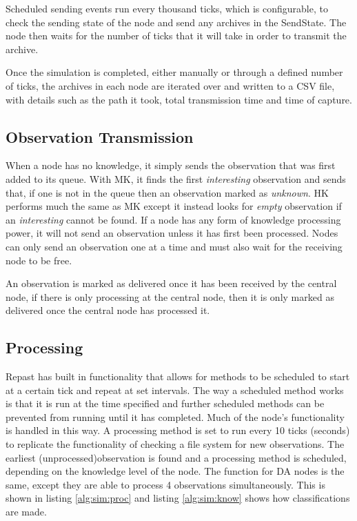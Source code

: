 	Scheduled sending events run every thousand ticks, which is configurable, to check the sending state of the node and send any archives in the SendState. The node then waits for the number of ticks that it will take in order to transmit the archive.
	
	Once the simulation is completed, either manually or through a defined number of ticks, the archives in each node are iterated over and written to a CSV file, with details such as the path it took, total transmission time and time of capture.


\subsection{Observation Transmission}
When a node has no knowledge, it simply sends the observation that was first added to its queue. With MK, it finds the first \textit{interesting} observation and sends that, if one is not in the queue then an observation marked as \textit{unknown}. HK performs much the same as MK except it instead looks for \textit{empty} observation if an \textit{interesting} cannot be found. If a node has any form of knowledge processing power, it will not send an observation unless it has first been processed. Nodes can only send an observation one at a time and must also wait for the receiving node to be free.

An observation is marked as delivered once it has been received by the central node, if there is only processing at the central node, then it is only marked as delivered once the central node has processed it.

\subsection{Processing}
Repast has built in functionality that allows for methods to be scheduled to start at a certain tick and repeat at set intervals. The way a scheduled method works is that it is run at the time specified and further scheduled methods can be prevented from running until it has completed. Much of the node's functionality is handled in this way. A processing method is set to run every 10 ticks (seconds) to replicate the functionality of checking a file system for new observations. The earliest (unprocessed)observation is found and a processing method is scheduled, depending on the knowledge level of the node. The function for DA nodes is the same, except they are able to process 4 observations simultaneously. This is shown in listing \ref{alg:sim:proc} and listing \ref{alg:sim:know} shows how classifications are made. 

